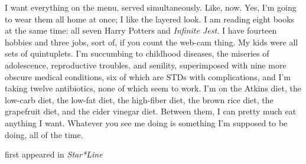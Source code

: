 I want everything on the menu, served simultaneously. Like, now. Yes,
I'm going to wear them all home at once; I like the layered look. I am
reading eight books at the same time: all seven Harry Potters and
\emph{Infinite Jest.} I have fourteen hobbies and three jobs, sort of,
if you count the web-cam thing. My kids were all sets of quintuplets.
I'm succumbing to childhood diseases, the miseries of adolescence,
reproductive troubles, and senility, superimposed with nine more obscure
medical conditions, six of which are STDs with complications, and I'm
taking twelve antibiotics, none of which seem to work. I'm on the Atkins
diet, the low-carb diet, the low-fat diet, the high-fiber diet, the
brown rice diet, the grapefruit diet, and the cider vinegar diet.
Between them, I can pretty much eat anything I want. Whatever you see me
doing is something I'm supposed to be doing, all of the time.

first appeared in \emph{Star*Line}
